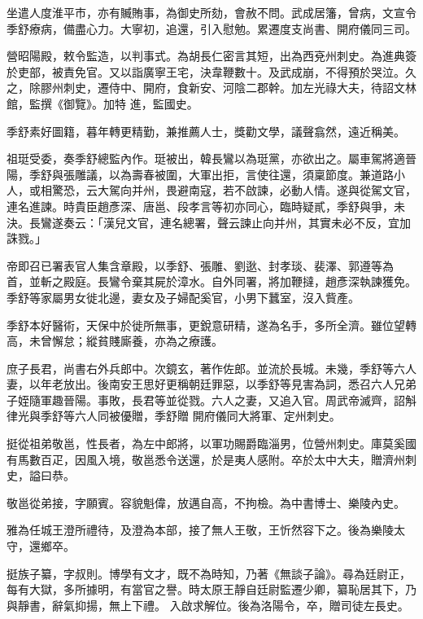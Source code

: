 \begin{pinyinscope}
 坐遣人度淮平市，亦有贓賄事，為御史所劾，會赦不問。武成居籓，曾病，文宣令季舒療病，備盡心力。大寧初，追還，引入慰勉。累遷度支尚書、開府儀同三司。



 營昭陽殿，敕令監造，以判事式。為胡長仁密言其短，出為西兗州刺史。為進典簽於吏部，被責免官。又以詣廣寧王宅，決韋鞭數十。及武成崩，不得預於哭泣。久之，除膠州刺史，遷侍中、開府，食新安、河陰二郡幹。加左光祿大夫，待詔文林館，監撰《御覽》。加特
 進，監國史。



 季舒素好圖籍，暮年轉更精勤，兼推薦人士，獎勸文學，議聲翕然，遠近稱美。



 祖珽受委，奏季舒總監內作。珽被出，韓長鸞以為珽黨，亦欲出之。屬車駕將適晉陽，季舒與張雕議，以為壽春被圍，大軍出拒，言使往還，須稟節度。兼道路小人，或相驚恐，云大駕向并州，畏避南寇，若不啟諫，必動人情。遂與從駕文官，連名進諫。時貴臣趙彥深、唐邕、段孝言等初亦同心，臨時疑貳，季舒與爭，未決。長鸞遂奏云：「漢兒文官，連名總署，聲云諫止向并州，其實未必不反，宜加誅戮。」



 帝即召已署表官人集含章殿，以季舒、張雕、劉逖、封孝琰、裴澤、郭遵等為
 首，並斬之殿庭。長鸞令棄其屍於漳水。自外同署，將加鞭撻，趙彥深執諫獲免。季舒等家屬男女徙北邊，妻女及子婦配奚官，小男下蠶室，沒入貲產。



 季舒本好醫術，天保中於徙所無事，更銳意研精，遂為名手，多所全濟。雖位望轉高，未曾懈怠；縱貧賤廝養，亦為之療護。



 庶子長君，尚書右外兵郎中。次鏡玄，著作佐郎。並流於長城。未幾，季舒等六人妻，以年老放出。後南安王思好更稱朝廷罪惡，以季舒等見害為詞，悉召六人兄弟子姪隨軍趣晉陽。事敗，長君等並從戮。六人之妻，又追入官。周武帝滅齊，詔斛律光與季舒等六人同被優贈，季舒贈
 開府儀同大將軍、定州刺史。



 挺從祖弟敬邕，性長者，為左中郎將，以軍功賜爵臨淄男，位營州刺史。庫莫奚國有馬數百疋，因風入境，敬邕悉令送還，於是夷人感附。卒於太中大夫，贈濟州刺史，謚曰恭。



 敬邕從弟接，字願賓。容貌魁偉，放邁自高，不拘檢。為中書博士、樂陵內史。



 雅為任城王澄所禮待，及澄為本部，接了無人王敬，王忻然容下之。後為樂陵太守，還鄉卒。



 挺族子纂，字叔則。博學有文才，既不為時知，乃著《無談子論》。尋為廷尉正，每有大獄，多所據明，有當官之譽。時太原王靜自廷尉監遷少卿，纂恥居其下，乃與靜書，辭氣抑揚，無上下禮。
 入啟求解位。後為洛陽令，卒，贈司徒左長史。




\end{pinyinscope}
